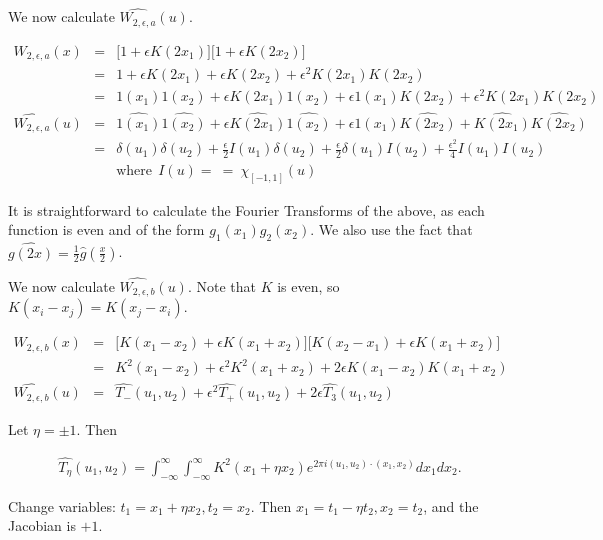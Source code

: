 \documentclass{compositio}
\newcommand{\foh}{\frac{1}{2}}  %
\begin{document}
We now calculate $\widehat{W_{2,\epsilon,a}}(u)$.

\begin{eqnarray}
W_{2,\epsilon,a}(x) & = & \Big[ 1 + \epsilon K(2x_1) \Big] \Big[1
+ \epsilon K(2x_2) \Big] \nonumber\\ & = & 1 + \epsilon K(2x_1) +
\epsilon K(2x_2) + \epsilon^2 K(2x_1) K(2x_2) \nonumber\\ & = &
1(x_1)1(x_2) + \epsilon K(2x_1) 1(x_2) + \epsilon 1(x_1) K(2x_2) +
\epsilon^2 K(2x_1) K(2x_2) \nonumber\\ \widehat{W_{2,\epsilon,
a}}(u) & = & \widehat{1(x_1)} \widehat{1(x_2)} + \epsilon
\widehat{K(2x_1)} \widehat{1(x_2)} + \epsilon \widehat{1(x_1)}
\widehat{K(2x_2)} + \widehat{K(2x_1)} \widehat{K(2x_2)}
\nonumber\\  & = & \delta(u_1) \delta(u_2) + \frac{\epsilon}{2}
I(u_1) \delta(u_2) + \frac{\epsilon}{2} \delta(u_1) I(u_2) +
\frac{\epsilon^2}{4}I(u_1) I(u_2) \nonumber\\ & & \mbox{where} \ \
I(u) = \ = \ \chi_{[-1,1]}(u)
\end{eqnarray}

It is straightforward to calculate the Fourier Transforms of the
above, as each function is even and of the form
$g_1(x_1)g_2(x_2)$. We also use the fact that $\widehat{g(2x)} =
\foh \widehat{g}(\frac{x}{2})$.

We now calculate $\widehat{W_{2,\epsilon,b}}(u)$. Note that $K$ is
even, so $K(x_i-x_j) = K(x_j-x_i)$.

\begin{eqnarray}
W_{2,\epsilon,b}(x) & = & \Big[K(x_1-x_2) + \epsilon K(x_1+x_2)
\Big] \Big[ K(x_2-x_1) + \epsilon K(x_1+x_2) \Big] \nonumber\\ & =
& K^2(x_1-x_2) + \epsilon^2 K^2(x_1+x_2) + 2 \epsilon K(x_1-x_2)
K(x_1+x_2) \nonumber\\ \widehat{W_{2,\epsilon,b}}(u) & = &
\widehat{T_-}(u_1,u_2) + \epsilon^2 \widehat{T_+}(u_1,u_2) + 2
\epsilon \widehat{T_3}(u_1,u_2)
\end{eqnarray}

Let $\eta = \pm 1$. Then

\begin{eqnarray}
\widehat{T_\eta}(u_1,u_2) = \int_{-\infty}^\infty
\int_{-\infty}^\infty K^2(x_1+\eta x_2) e^{2\pi i (u_1,u_2) \cdot
(x_1,x_2)} dx_1 dx_2.
\end{eqnarray}

Change variables: $t_1 = x_1 + \eta x_2, t_2 = x_2$. Then $x_1 =
t_1 -\eta t_2, x_2 = t_2$, and the Jacobian is $+1$.
\end{document}
